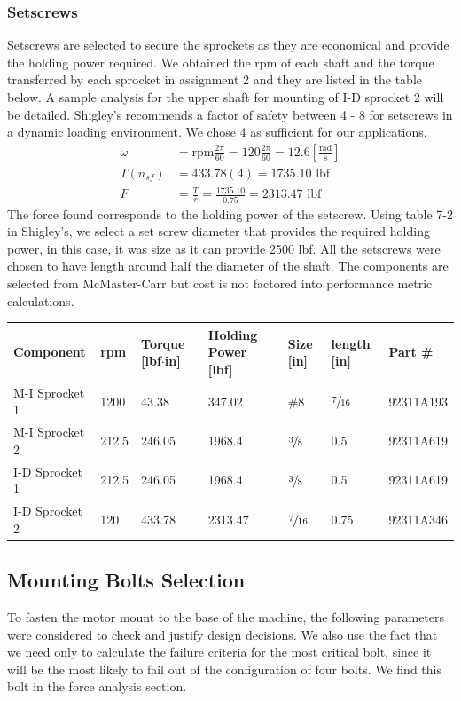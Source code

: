\documentclass[letterpaper,12pt]{article}
\begin{document}
\subsubsection{Setscrews}
Setscrews are selected to secure the sprockets as they are economical and provide the holding power required. We obtained the rpm of each shaft and the torque transferred by each sprocket in assignment 2 and they are listed in the table below. A sample analysis for the upper shaft for mounting of I-D sprocket 2 will be detailed. 
Shigley's recommends a factor of safety between 4 - 8 for setscrews in a dynamic loading environment. We chose 4 as sufficient for our applications. 
\begin{align*}
    \omega &= \text{rpm}\frac{2\pi}{60} = 120\frac{2\pi}{60} = 12.6 \left[\frac{\text{rad}}{\text{s}}\right] \\
    T (n_{sf}) &= 433.78(4) = 1735.10 \text{ lbf} \tag{apply factor of safety}\\
    F &= \frac{T}{r} = \frac{1735.10}{0.75} = 2313.47 \text{ lbf} \tag{force applying the torque}
\end{align*}
The force found corresponds to the holding power of the setscrew. Using table 7-2 in Shigley's, we select a set screw diameter that provides the required holding power, in this case, it was size  as it can provide 2500 lbf. All the setscrews were chosen to have length around half the diameter of the shaft. The components are selected from McMaster-Carr but cost is not factored into performance metric calculations. 
\begin{center}
	\begin{tabular}{ |p{2.5cm}||p{1.25cm}|p{1.25cm}|p{2cm}|p{1.5cm}|p{1.75cm}|p{2cm}|}
		\hline
		Component & rpm & Torque [lbf$\cdot$in] & Holding Power [lbf] & Size [in] & length [in] & Part \# \\
		\hline
		M-I Sprocket 1 & 1200 & 43.38 & 347.02 & \#8 &$\sfrac{7}{16}$ & 92311A193\\
	    M-I Sprocket 2 & 212.5 & 246.05 & 1968.4 & $\sfrac{3}{8}$ &0.5& 92311A619\\
		I-D Sprocket 1  & 212.5 & 246.05&  1968.4  & $\sfrac{3}{8}$&0.5& 92311A619\\
		I-D Sprocket 2 & 120 & 433.78  & 2313.47 & $\sfrac{7}{16}$ & 0.75 & 92311A346\\
		\hline
	\end{tabular}
\end{center}

\subsection{Mounting Bolts Selection}
To fasten the motor mount to the base of the machine, the following parameters were considered to check and justify design decisions. We also use the fact that we need only to calculate the failure criteria for the most critical bolt, since it will be the most likely to fail out of the configuration of four bolts. We find this bolt in the force analysis section.
\end{document}
